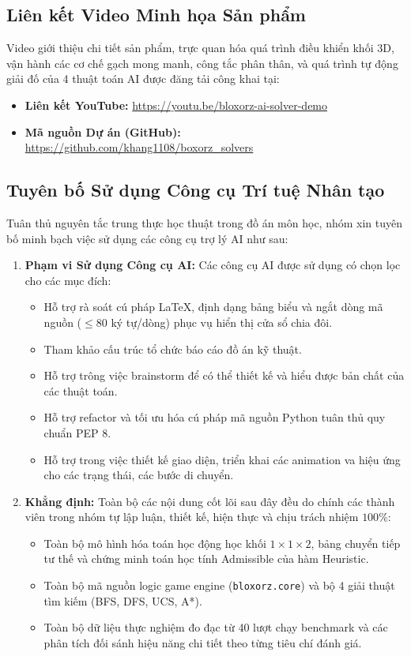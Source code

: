 \subsection{Liên kết Video Minh họa Sản phẩm}
Video giới thiệu chi tiết sản phẩm, trực quan hóa quá trình điều khiển khối 3D,
vận hành các cơ chế gạch mong manh, công tắc phân thân, và quá trình tự động
giải đố của 4 thuật toán AI được đăng tải công khai tại:
\begin{itemize}[--]
    \item \textbf{Liên kết YouTube:}
    \url{https://youtu.be/bloxorz-ai-solver-demo}
    \item \textbf{Mã nguồn Dự án (GitHub):}
    \url{https://github.com/khang1108/boxorz_solvers}
\end{itemize}

\subsection{Tuyên bố Sử dụng Công cụ Trí tuệ Nhân tạo}
Tuân thủ nguyên tắc trung thực học thuật trong đồ án môn học, nhóm xin
tuyên bố minh bạch việc sử dụng các công cụ trợ lý AI như sau:

\begin{enumerate}[1.]
    \item \textbf{Phạm vi Sử dụng Công cụ AI:}
    Các công cụ AI được sử dụng có chọn lọc cho các mục đích:
    \begin{itemize}[--]
        \item Hỗ trợ rà soát cú pháp LaTeX, định dạng bảng biểu và ngắt dòng mã
        nguồn ($\le 80$ ký tự/dòng) phục vụ hiển thị cửa sổ chia đôi.
        \item Tham khảo cấu trúc tổ chức báo cáo đồ án kỹ thuật.
        \item Hỗ trợ trông việc brainstorm để có thể thiết kế và hiểu được bản chất của các thuật toán.
        \item Hỗ trợ refactor và tối ưu hóa cú pháp mã nguồn Python tuân thủ
        quy chuẩn PEP 8.
        \item Hỗ trợ trong việc thiết kế giao diện, triển khai các animation va hiệu ứng
        cho các trạng thái, các bước di chuyển. 
    \end{itemize}

    \item \textbf{Khẳng định:}
    Toàn bộ các nội dung cốt lõi sau đây đều do chính các thành viên trong nhóm
    tự lập luận, thiết kế, hiện thực và chịu trách nhiệm $100\%$:
    \begin{itemize}[--]
        \item Toàn bộ mô hình hóa toán học động học khối $1 \times 1 \times 2$,
        bảng chuyển tiếp tư thế và chứng minh toán học tính Admissible của
        hàm Heuristic.
        \item Toàn bộ mã nguồn logic game engine (\texttt{bloxorz.core}) và
        bộ 4 giải thuật tìm kiếm (BFS, DFS, UCS, A*).
        \item Toàn bộ dữ liệu thực nghiệm đo đạc từ 40 lượt chạy benchmark
        và các phân tích đối sánh hiệu năng chi tiết theo từng tiêu chí đánh giá.
    \end{itemize}
\end{enumerate}
